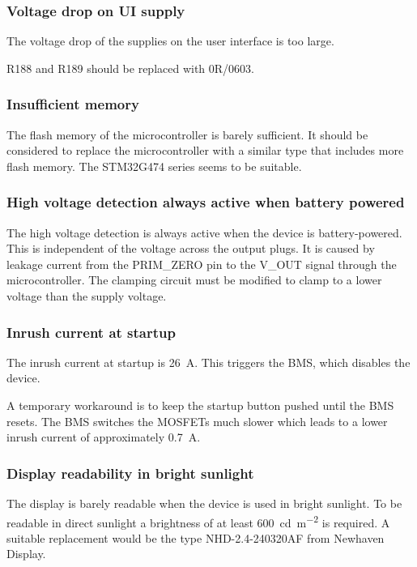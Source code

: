\subsubsection{Voltage drop on UI supply}
The voltage drop of the supplies on the user interface is too large. 

R188 and R189 should be replaced with 0R/0603. 

\subsubsection{Insufficient memory}
The flash memory of the microcontroller is barely sufficient. It should be considered to replace the microcontroller with a similar type that includes more flash memory. The STM32G474 series seems to be suitable. 

\subsubsection{High voltage detection always active when battery powered}
The high voltage detection is always active when the device is battery-powered. This is independent of the voltage across the output plugs. It is caused by leakage current from the PRIM\_ZERO pin to the V\_OUT signal through the microcontroller. 
The clamping circuit must be modified to clamp to a lower voltage than the supply voltage. 

\subsubsection{Inrush current at startup}
The inrush current at startup is \qty{26}{\ampere}. This triggers the BMS, which disables the device. 

A temporary workaround is to keep the startup button pushed until the BMS resets. The BMS switches the \acp{MOSFET} much slower which leads to a lower inrush current of approximately \qty{0.7}{\ampere}. 


\subsubsection{Display readability in bright sunlight}
The display is barely readable when the device is used in bright sunlight. To be readable in direct sunlight a brightness of at least \qty{600}{\candela\per\square\meter} is required. A suitable replacement would be the type NHD-2.4-240320AF from Newhaven Display. 

